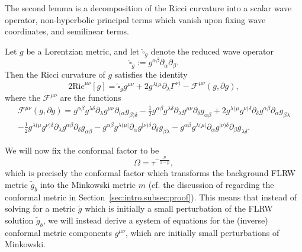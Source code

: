 \documentclass{article}
\newcommand{\Ric}{\mathrm{Ric}}
\newcommand{\mc}{\mathcal}
\newcommand{\wh}{\widehat}
\newcommand{\wt}{\widetilde}
\newcommand{\pa}{\partial}
\begin{document}
The second lemma is a decomposition of the Ricci curvature into a scalar wave operator, non-hyperbolic principal terms which vanish upon fixing wave coordinates, and semilinear terms.
\begin{lemma}\label{sec:gaugedeqs.lem:ricciwave}
    Let $g$ be a Lorentzian metric, and let $\wh{\square}_g$ denote the reduced wave operator 
    \begin{equation}\label{sec:gaugedeqs.eq:reducedwaveoperator}
    \wh{\square}_g := g^{\alpha\beta}\pa_\alpha\pa_\beta.
    \end{equation}
    Then the Ricci curvature of $g$ satisfies the identity
    \begin{equation}
        2\Ric^{\mu\nu}[g] = \wh{\square}_g g^{\mu\nu} + 2g^{\lambda(\mu}\pa_\lambda \Gamma^{\nu)} - \mc{F}^{\mu\nu}(g,\pa g),
    \end{equation}
    where the $\mc{F}^{\mu\nu}$ are the functions
    \begin{multline}\label{sec:gaugedeqs.eq:semilinearterms}
        \mc{F}^{\mu\nu}(g,\pa g) = g^{\alpha\beta}g^{\lambda\delta}\pa_\lambda g^{\mu\nu}\pa_{(\alpha} g_{\beta)\delta} - \frac{1}{2}g^{\alpha\beta}g^{\lambda\delta}\pa_\lambda g^{\mu\nu}\pa_\delta g_{\alpha\beta} + 2g^{\lambda(\mu}g^{\nu)\delta}\pa_\delta g^{\alpha\beta}\pa_\alpha g_{\beta\lambda}\\- \frac{1}{2}g^{\lambda(\mu}g^{\nu)\delta}\pa_\lambda g^{\alpha\beta}\pa_\delta g_{\alpha\beta}
        -g^{\alpha\beta}g^{\lambda(\mu|}\pa_\alpha g^{|\nu)\delta}\pa_\delta g_{\beta\lambda} - g^{\alpha\beta}g^{\lambda(\mu|}\pa_\alpha g^{|\nu)\delta}\pa_\beta g_{\lambda\delta}.
    \end{multline}
\end{lemma}

We will now fix the conformal factor to be
\begin{equation}\label{sec:gaugedeqs.eq:conformalfactor}
    \Omega = \tau^{-\frac{p}{1-p}},
\end{equation}
which is precisely the conformal factor which transforms the background FLRW metric $\wt{g}_b$ into the Minkowski metric $m$ (cf. the discussion of regarding the conformal metric in Section~\ref{sec:intro.subsec:proof}). This means that instead of solving for a metric $\wt{g}$ which is initially a small perturbation of the FLRW solution $\wt{g}_b$, we will instead derive a system of equations for the (inverse) conformal metric components $g^{\mu\nu}$, which are initially small perturbations of Minkowski.
\end{document}
